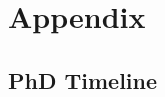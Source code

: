 
\chapter{Appendix} \label{sec:appendix}



\newpage

\section{PhD Timeline} \label{sec:appendix:timeline}


